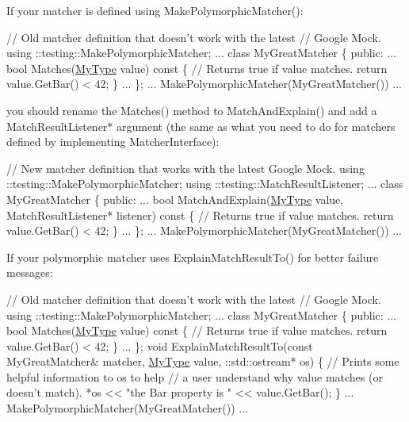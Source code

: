 If your matcher is defined using {\ttfamily Make\+Polymorphic\+Matcher()}\+: 
\begin{DoxyCode}
\textcolor{comment}{// Old matcher definition that doesn't work with the latest}
\textcolor{comment}{// Google Mock.}
using ::testing::MakePolymorphicMatcher;
...
class MyGreatMatcher \{
 \textcolor{keyword}{public}:
  ...
  \textcolor{keywordtype}{bool} Matches(\hyperlink{classMyType}{MyType} value)\textcolor{keyword}{ const }\{
    \textcolor{comment}{// Returns true if value matches.}
    \textcolor{keywordflow}{return} value.GetBar() < 42;
  \}
  ...
\};
... MakePolymorphicMatcher(MyGreatMatcher()) ...
\end{DoxyCode}


you should rename the {\ttfamily Matches()} method to {\ttfamily Match\+And\+Explain()} and add a {\ttfamily Match\+Result\+Listener$\ast$} argument (the same as what you need to do for matchers defined by implementing {\ttfamily Matcher\+Interface})\+: 
\begin{DoxyCode}
\textcolor{comment}{// New matcher definition that works with the latest Google Mock.}
using ::testing::MakePolymorphicMatcher;
using ::testing::MatchResultListener;
...
class MyGreatMatcher \{
 \textcolor{keyword}{public}:
  ...
  \textcolor{keywordtype}{bool} MatchAndExplain(\hyperlink{classMyType}{MyType} value,
                       MatchResultListener* listener)\textcolor{keyword}{ const }\{
    \textcolor{comment}{// Returns true if value matches.}
    \textcolor{keywordflow}{return} value.GetBar() < 42;
  \}
  ...
\};
... MakePolymorphicMatcher(MyGreatMatcher()) ...
\end{DoxyCode}


If your polymorphic matcher uses {\ttfamily Explain\+Match\+Result\+To()} for better failure messages\+: 
\begin{DoxyCode}
\textcolor{comment}{// Old matcher definition that doesn't work with the latest}
\textcolor{comment}{// Google Mock.}
using ::testing::MakePolymorphicMatcher;
...
class MyGreatMatcher \{
 \textcolor{keyword}{public}:
  ...
  \textcolor{keywordtype}{bool} Matches(\hyperlink{classMyType}{MyType} value)\textcolor{keyword}{ const }\{
    \textcolor{comment}{// Returns true if value matches.}
    \textcolor{keywordflow}{return} value.GetBar() < 42;
  \}
  ...
\};
\textcolor{keywordtype}{void} ExplainMatchResultTo(\textcolor{keyword}{const} MyGreatMatcher& matcher,
                          \hyperlink{classMyType}{MyType} value,
                          ::std::ostream* os) \{
  \textcolor{comment}{// Prints some helpful information to os to help}
  \textcolor{comment}{// a user understand why value matches (or doesn't match).}
  *os << \textcolor{stringliteral}{"the Bar property is "} << value.GetBar();
\}
... MakePolymorphicMatcher(MyGreatMatcher()) ...
\end{DoxyCode}


